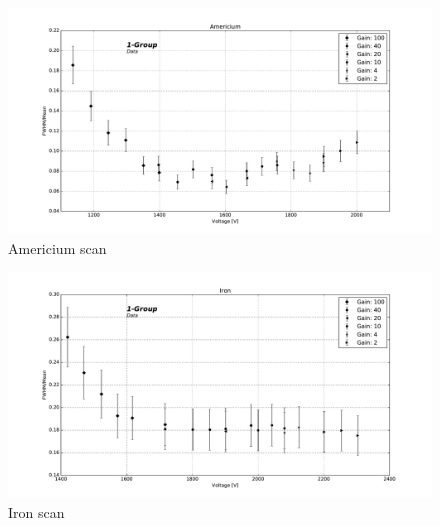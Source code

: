 \begin{figure}[htb]
  \includegraphics[width=\linewidth]{graphics/americium_scan}
  \caption{Americium scan}
  \label{fig:resolution:americium}
\end{figure}

\begin{figure}[htb]
  \includegraphics[width=\linewidth]{graphics/iron_scan}
  \caption{Iron scan}
  \label{fig:resolution:iron}
\end{figure}
